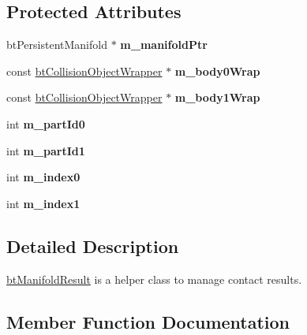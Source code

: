 \subsection*{Protected Attributes}
\begin{DoxyCompactItemize}
\item 
\mbox{\label{classbtManifoldResult_a3780f000196cb804b413c6a89d386279}} 
bt\+Persistent\+Manifold $\ast$ {\bfseries m\+\_\+manifold\+Ptr}
\item 
\mbox{\label{classbtManifoldResult_a25c2b07a56d94fd1f5c996bccea5fcdf}} 
const \hyperlink{structbtCollisionObjectWrapper}{bt\+Collision\+Object\+Wrapper} $\ast$ {\bfseries m\+\_\+body0\+Wrap}
\item 
\mbox{\label{classbtManifoldResult_aa7c0a224b16443ef764ab86e6cf7e48c}} 
const \hyperlink{structbtCollisionObjectWrapper}{bt\+Collision\+Object\+Wrapper} $\ast$ {\bfseries m\+\_\+body1\+Wrap}
\item 
\mbox{\label{classbtManifoldResult_a1102526a3290f8d9cd399ed6c11513f1}} 
int {\bfseries m\+\_\+part\+Id0}
\item 
\mbox{\label{classbtManifoldResult_a5aeb5f67205d6414f832cd2a9a1a6f73}} 
int {\bfseries m\+\_\+part\+Id1}
\item 
\mbox{\label{classbtManifoldResult_a8d7d067fb1799b3992196f80e8aa3c28}} 
int {\bfseries m\+\_\+index0}
\item 
\mbox{\label{classbtManifoldResult_aff6db948e364ab9ed2fc8bb7e7557305}} 
int {\bfseries m\+\_\+index1}
\end{DoxyCompactItemize}


\subsection{Detailed Description}
\hyperlink{classbtManifoldResult}{bt\+Manifold\+Result} is a helper class to manage contact results. 

\subsection{Member Function Documentation}
\mbox{\label{classbtManifoldResult_aebe32f0c202d988d0458e88d768602c6}} 
